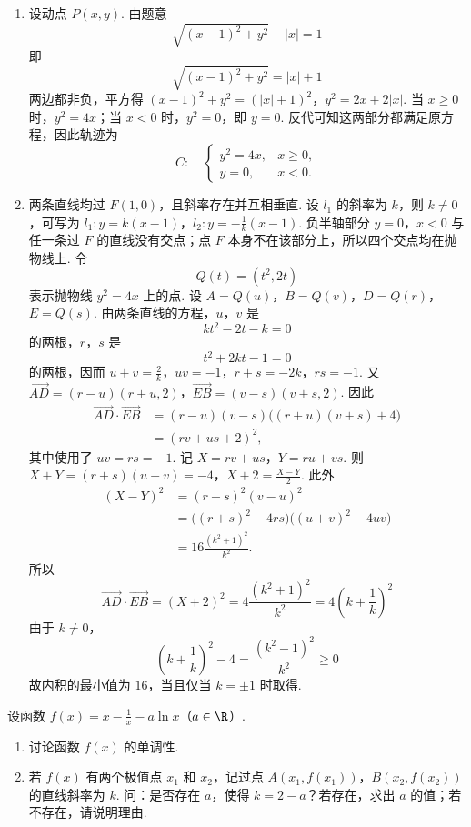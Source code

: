 \begin{solution}
\begin{enumerate}
\item
设动点 \(P(x,y)\). 由题意
\[
\sqrt{(x-1)^2+y^2}-|x|=1
\]
即
\[
\sqrt{(x-1)^2+y^2}=|x|+1
\]
两边都非负，平方得
\((x-1)^2+y^2=(|x|+1)^2\)，\(y^2=2x+2|x|\).
当 \(x\geqslant0\) 时，\(y^2=4x\)；当 \(x<0\) 时，\(y^2=0\)，即 \(y=0\). 反代可知这两部分都满足原方程，因此轨迹为
\[
C:\quad
\begin{cases}
y^2=4x,&x\geqslant0,\\
y=0,&x<0.
\end{cases}
\]

\item
两条直线均过 \(F(1,0)\)，且斜率存在并互相垂直. 设 \(l_1\) 的斜率为 \(k\)，则 \(k\ne0\)，可写为
\(l_1:y=k(x-1)\)，\(l_2:y=-\frac1k(x-1)\).
负半轴部分 \(y=0\)，\(x<0\) 与任一条过 \(F\) 的直线没有交点；点 \(F\) 本身不在该部分上，所以四个交点均在抛物线上. 令
\[
Q(t)=(t^2,2t)
\]
表示抛物线 \(y^2=4x\) 上的点. 设
\(A=Q(u)\)，\(B=Q(v)\)，\(D=Q(r)\)，\(E=Q(s)\).
由两条直线的方程，\(u\)，\(v\) 是
\[
kt^2-2t-k=0
\]
的两根，\(r\)，\(s\) 是
\[
t^2+2kt-1=0
\]
的两根，因而
\(u+v=\frac2k\)，\(uv=-1\)，\(r+s=-2k\)，\(rs=-1\).
又
\(\overrightarrow{AD}=(r-u)(r+u,2)\)，\(\overrightarrow{EB}=(v-s)(v+s,2)\).
因此
\[
\begin{aligned}
\overrightarrow{AD}\cdot\overrightarrow{EB}
&=(r-u)(v-s)\bigl((r+u)(v+s)+4\bigr)\\
&=(rv+us+2)^2,
\end{aligned}
\]
其中使用了 \(uv=rs=-1\). 记
\(X=rv+us\)，\(Y=ru+vs\).
则
\(X+Y=(r+s)(u+v)=-4\)，\(X+2=\frac{X-Y}{2}\).
此外
\[
\begin{aligned}
(X-Y)^2
&=(r-s)^2(v-u)^2\\
&=\bigl((r+s)^2-4rs\bigr)\bigl((u+v)^2-4uv\bigr)\\
&=16\frac{(k^2+1)^2}{k^2}.
\end{aligned}
\]
所以
\[
\overrightarrow{AD}\cdot\overrightarrow{EB}
=(X+2)^2
=4\frac{(k^2+1)^2}{k^2}
=4\left(k+\frac1k\right)^2
\]
由于 \(k\ne0\)，
\[
\left(k+\frac1k\right)^2-4
=\frac{(k^2-1)^2}{k^2}\geqslant0
\]
故内积的最小值为 \(16\)，当且仅当 \(k=\pm1\) 时取得.
\end{enumerate}
\end{solution}

\begin{problem}
设函数 \( f(x) = x - \frac{1}{x} - a \ln x  \)（\(a \in \R\)）.
\begin{enumerate}
\item 讨论函数 \( f(x) \) 的单调性.
\item 若 \( f(x) \) 有两个极值点 \( x_{1} \) 和 \( x_{2} \)，记过点 \( A(x_{1}, f(x_{1})) \)，\( B(x_{2}, f(x_{2})) \) 的直线斜率为 \( k \). 问：是否存在 \( a \)，使得 \( k = 2 - a \)？若存在，求出 \( a \) 的值；若不存在，请说明理由.
\end{enumerate}
\end{problem}

